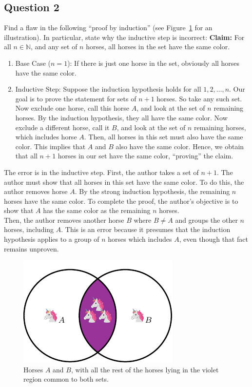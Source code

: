 \subsection*{Question 2}
Find a flaw in the following ``proof by induction'' (see Figure~\ref{fig:horse} for an illustration). In particular, state why the inductive step is incorrect:
\vspace{0.5cm}
\noindent \textbf{Claim:} For all $n \in \mathbb{N}$, and any set of $n$ horses, all horses in the set have the same color.
\begin{enumerate}
    \item Base Case ($n=1$): If there is just one horse in the set, obviously all horses have the same color.
    \item Inductive Step: Suppose the induction hypothesis holds for all $1,2,\ldots,n$. Our goal is to prove the statement for sets of $n+1$ horses. So take any such set. Now exclude one horse, call this horse $A$, and look at the set of $n$ remaining horses. By the induction hypothesis, they all have the same color. Now exclude a different horse, call it $B$, and look at the set of $n$ remaining horses, which includes horse $A$. Then, all horses in this set must also have the same color. This implies that $A$ and $B$ also have the same color. Hence, we obtain that all $n+1$ horses in our set have the same color, ``proving'' the claim. 
\end{enumerate}
\begin{solution}
The error is in the inductive step. First, the author takes a set of $n+1$. The author must show that all horses in this set have the same color. To do this, the author removes horse $A$. By the strong induction hypothesis, the remaining $n$ horses have the same color. To complete the proof, the author's objective is to show that $A$ has the same color as the remaining $n$ horses.\\

Then, the author removes another horse $B$ where $B\neq A$ and groups the other $n$ horses, including $A$. This is an error because it presumes that the induction hypothesis applies to a group of $n$ horses which includes $A$, even though that fact remains unproven.
\end{solution}
\begin{figure}[h]
    \centering
    \includegraphics{../images/horse_venn.pdf}
    \caption{Horses $A$ and $B$, with all the rest of the horses lying in the violet region common to both sets.}
    \label{fig:horse}
\end{figure}
\newpage
